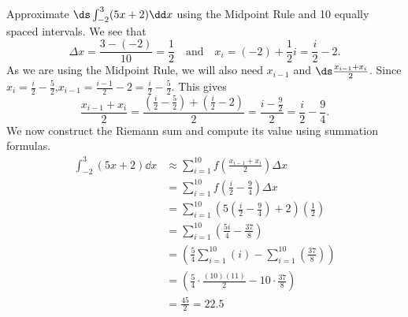 \begin{example}\label{ex_rie8}
Approximate $\ds\int_{-2}^3 (5x+2)\dd x$ using the Midpoint Rule and 10 equally spaced intervals.
\solution
We see that %
\[
 \Delta x = \frac{3 - (-2)}{10} = \frac12
 \quad \text{and} \quad
 x_i = (-2) + \frac12 i = \frac i2-2.
\]
As we are using the Midpoint Rule, we will also need $x_{i-1}$ and $\ds \frac{x_{i-1}+x_i}2$. Since $x_i = \frac i2-\frac52$,\quad $x_{i-1} = \frac{i-1}2 - 2 = \frac i2 -\frac52$.  This gives 
\[
 \frac{x_{i-1}+x_i}2 = \frac{(\frac i2-\frac52) + (\frac i2-2)}{2} = \frac{i-\frac92}{2} = \frac i2 - \frac94.
\]
We now construct the Riemann sum and compute its value using summation formulas.
\begin{align*}
	\int_{-2}^3 (5x+2)\dd x
	&\approx \sum_{i=1}^{10} f\left(\frac{x_{i-1}+x_i}{2}\right)\Delta x \\
	&= \sum_{i=1}^{10} f\left(\frac i2 - \frac94\right)\Delta x \\
	&= \sum_{i=1}^{10} \left(5\left(\frac i2-\frac94\right) + 2\right)\left(\frac12\right)\\
	&= \sum_{i=1}^{10}\left(\frac{5i}4 - \frac{37}8\right)\\
	&= \left(\frac54\sum_{i=1}^{10} (i) -
	 \sum_{i=1}^{10}\left(\frac{37}8\right)\right) \\
	&= \left(\frac54\cdot\frac{(10)(11)}2 - 10\cdot\frac{37}8\right)  \\
	&= \frac{45}2 = 22.5
\end{align*}



\end{example}
